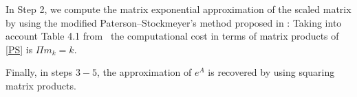 In Step 2, we compute the matrix exponential
approximation of the scaled matrix by using the modified Paterson--Stockmeyer's method proposed in \cite[p.
1836-1837]{SIDR11b}:
{\setlength{}
\label{PS}
}
Taking into account Table 4.1 from~\cite{High08} the computational cost in terms of matrix products of \eqref{PS}  is $\Pi {m_k} = k$.

Finally, in steps $3-5$, the approximation of $e^{A}$ is recovered by using squaring matrix products.

  
